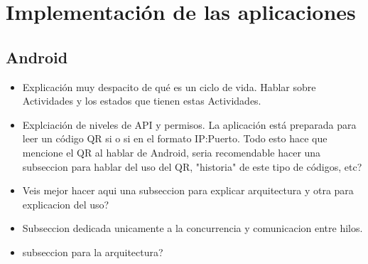 %
%
%
%
%
%
%
%
%
%

\chapter{Implementaci\'on de las aplicaciones}
\label{cap4}
\label{cap:impl}

\section{Android}

\begin {itemize}
\item Explicaci\'on muy despacito de qu\'e es un ciclo de vida. Hablar sobre Actividades y los estados que tienen estas Actividades.
\item Explciaci\'on de niveles de API y permisos. La aplicaci\'on est\'a preparada para leer un c\'odigo QR si o si en el formato IP:Puerto. Todo esto hace que mencione el QR al hablar de Android, seria recomendable hacer una subseccion para hablar del uso del QR, "historia" de este tipo de c\'odigos, etc?
\item Veis mejor hacer aqui una subseccion para explicar arquitectura y otra para explicacion del uso?
\item Subseccion dedicada unicamente a la concurrencia y comunicacion entre hilos.
\item subseccion para la arquitectura?
\end {itemize}


